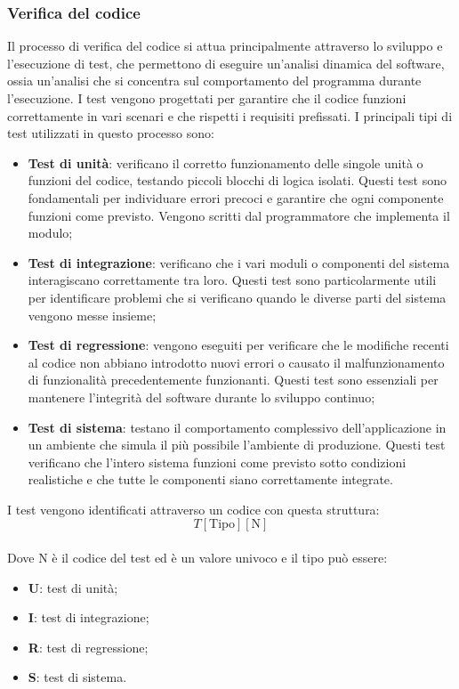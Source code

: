 \subsubsection{Verifica del codice}
Il processo di verifica del codice si attua principalmente attraverso lo
sviluppo e l'esecuzione di test, che permettono di eseguire un'analisi dinamica
del software, ossia un'analisi che si concentra sul comportamento del programma
durante l'esecuzione. I test vengono progettati per garantire che il codice
funzioni correttamente in vari scenari e che rispetti i requisiti prefissati. I
principali tipi di test utilizzati in questo processo sono:
\begin{itemize}
      \item \textbf{Test di unità}: verificano il corretto funzionamento delle singole unità o funzioni del codice, testando piccoli blocchi di logica isolati. Questi test sono fondamentali per individuare errori precoci e garantire che ogni componente funzioni come previsto. Vengono scritti dal programmatore che implementa il modulo;
      \item \textbf{Test di integrazione}: verificano che i vari moduli o componenti del sistema interagiscano correttamente tra loro. Questi test sono particolarmente utili per identificare problemi che si verificano quando le diverse parti del sistema vengono messe insieme;
      \item \textbf{Test di regressione}: vengono eseguiti per verificare che le modifiche recenti al codice non abbiano introdotto nuovi errori o causato il malfunzionamento di funzionalità precedentemente funzionanti. Questi test sono essenziali per mantenere l'integrità del software durante lo sviluppo continuo;
      \item \textbf{Test di sistema}: testano il comportamento complessivo dell'applicazione in un ambiente che simula il più possibile l'ambiente di produzione. Questi test verificano che l'intero sistema funzioni come previsto sotto condizioni realistiche e che tutte le componenti siano correttamente integrate.
\end{itemize}
I test vengono identificati attraverso un codice con questa struttura:
\textbf{
      \[
            T[\text{Tipo}][ \text{N}]
      \]
}
\\Dove N è il codice del test ed è un valore univoco e il tipo può essere:
\begin{itemize}
      \item \textbf{U}: test di unità;
      \item \textbf{I}: test di integrazione;
      \item \textbf{R}: test di regressione;
      \item \textbf{S}: test di sistema.
\end{itemize}

